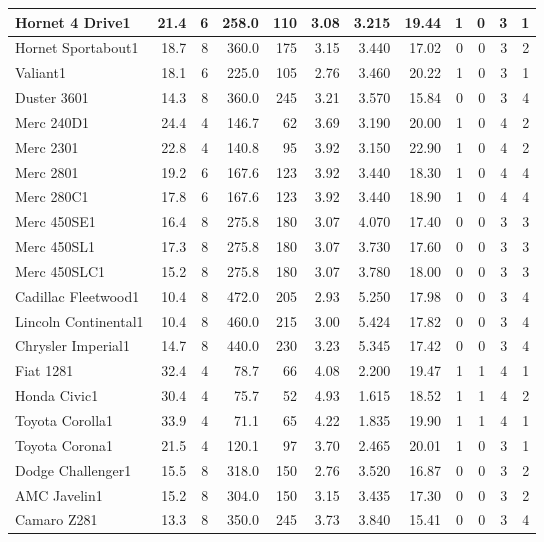 \documentclass[
  letterpaper,
  DIV=11,
  numbers=noendperiod]{scrartcl}
\begin{document}
\begin{longtable}[t]{l|r|r|r|r|r|r|r|r|r|r|r}
\hline
Hornet 4 Drive1 & 21.4 & 6 & 258.0 & 110 & 3.08 & 3.215 & 19.44 & 1 & 0 & 3 & 1\\
\hline
Hornet Sportabout1 & 18.7 & 8 & 360.0 & 175 & 3.15 & 3.440 & 17.02 & 0 & 0 & 3 & 2\\
\hline
Valiant1 & 18.1 & 6 & 225.0 & 105 & 2.76 & 3.460 & 20.22 & 1 & 0 & 3 & 1\\
\hline
Duster 3601 & 14.3 & 8 & 360.0 & 245 & 3.21 & 3.570 & 15.84 & 0 & 0 & 3 & 4\\
\hline
Merc 240D1 & 24.4 & 4 & 146.7 & 62 & 3.69 & 3.190 & 20.00 & 1 & 0 & 4 & 2\\
\hline
Merc 2301 & 22.8 & 4 & 140.8 & 95 & 3.92 & 3.150 & 22.90 & 1 & 0 & 4 & 2\\
\hline
Merc 2801 & 19.2 & 6 & 167.6 & 123 & 3.92 & 3.440 & 18.30 & 1 & 0 & 4 & 4\\
\hline
Merc 280C1 & 17.8 & 6 & 167.6 & 123 & 3.92 & 3.440 & 18.90 & 1 & 0 & 4 & 4\\
\hline
Merc 450SE1 & 16.4 & 8 & 275.8 & 180 & 3.07 & 4.070 & 17.40 & 0 & 0 & 3 & 3\\
\hline
Merc 450SL1 & 17.3 & 8 & 275.8 & 180 & 3.07 & 3.730 & 17.60 & 0 & 0 & 3 & 3\\
\hline
Merc 450SLC1 & 15.2 & 8 & 275.8 & 180 & 3.07 & 3.780 & 18.00 & 0 & 0 & 3 & 3\\
\hline
Cadillac Fleetwood1 & 10.4 & 8 & 472.0 & 205 & 2.93 & 5.250 & 17.98 & 0 & 0 & 3 & 4\\
\hline
Lincoln Continental1 & 10.4 & 8 & 460.0 & 215 & 3.00 & 5.424 & 17.82 & 0 & 0 & 3 & 4\\
\hline
Chrysler Imperial1 & 14.7 & 8 & 440.0 & 230 & 3.23 & 5.345 & 17.42 & 0 & 0 & 3 & 4\\
\hline
Fiat 1281 & 32.4 & 4 & 78.7 & 66 & 4.08 & 2.200 & 19.47 & 1 & 1 & 4 & 1\\
\hline
Honda Civic1 & 30.4 & 4 & 75.7 & 52 & 4.93 & 1.615 & 18.52 & 1 & 1 & 4 & 2\\
\hline
Toyota Corolla1 & 33.9 & 4 & 71.1 & 65 & 4.22 & 1.835 & 19.90 & 1 & 1 & 4 & 1\\
\hline
Toyota Corona1 & 21.5 & 4 & 120.1 & 97 & 3.70 & 2.465 & 20.01 & 1 & 0 & 3 & 1\\
\hline
Dodge Challenger1 & 15.5 & 8 & 318.0 & 150 & 2.76 & 3.520 & 16.87 & 0 & 0 & 3 & 2\\
\hline
AMC Javelin1 & 15.2 & 8 & 304.0 & 150 & 3.15 & 3.435 & 17.30 & 0 & 0 & 3 & 2\\
\hline
Camaro Z281 & 13.3 & 8 & 350.0 & 245 & 3.73 & 3.840 & 15.41 & 0 & 0 & 3 & 4\\

\end{longtable}
\end{document}
